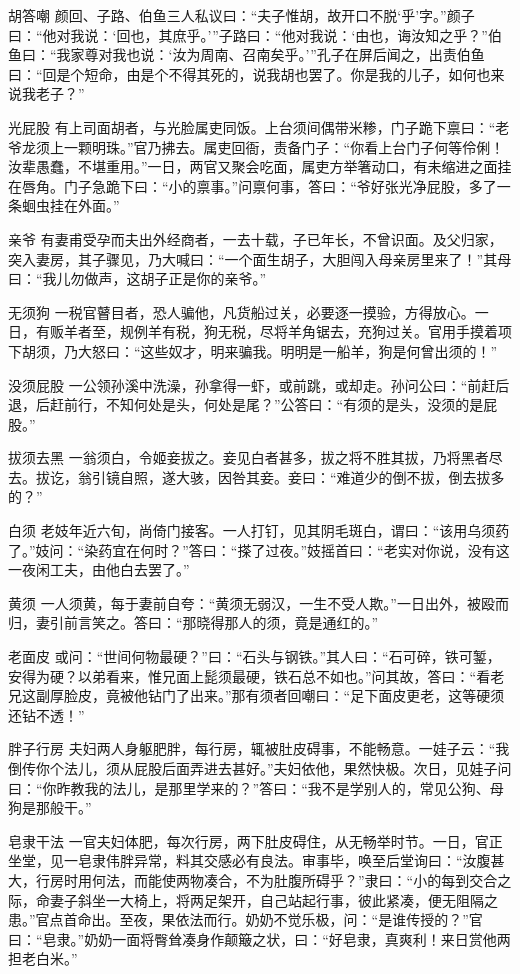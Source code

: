 \documentclass[12pt,UTF8]{ctexbook}
\begin{document}
胡答嘲
颜回、子路、伯鱼三人私议曰：“夫子惟胡，故开口不脱‘乎’字。”颜子曰：“他对我说：‘回也，其庶乎。’”子路曰：“他对我说：‘由也，诲汝知之乎？”伯鱼曰：“我家尊对我也说：‘汝为周南、召南矣乎。’”孔子在屏后闻之，出责伯鱼曰：“回是个短命，由是个不得其死的，说我胡也罢了。你是我的儿子，如何也来说我老子？”

光屁股
有上司面胡者，与光脸属吏同饭。上台须间偶带米糁，门子跪下禀曰：“老爷龙须上一颗明珠。”官乃拂去。属吏回衙，责备门子：“你看上台门子何等伶俐！汝辈愚蠢，不堪重用。”一日，两官又聚会吃面，属吏方举箸动口，有未缩进之面挂在唇角。门子急跪下曰：“小的禀事。”问禀何事，答曰：“爷好张光净屁股，多了一条蛔虫挂在外面。”

亲爷
有妻甫受孕而夫出外经商者，一去十载，子已年长，不曾识面。及父归家，突入妻房，其子骤见，乃大喊曰：“一个面生胡子，大胆闯入母亲房里来了！”其母曰：“我儿勿做声，这胡子正是你的亲爷。”

无须狗
一税官瞽目者，恐人骗他，凡货船过关，必要逐一摸验，方得放心。一日，有贩羊者至，规例羊有税，狗无税，尽将羊角锯去，充狗过关。官用手摸着项下胡须，乃大怒曰：“这些奴才，明来骗我。明明是一船羊，狗是何曾出须的！”

没须屁股
一公领孙溪中洗澡，孙拿得一虾，或前跳，或却走。孙问公曰：“前赶后退，后赶前行，不知何处是头，何处是尾？”公答曰：“有须的是头，没须的是屁股。”

拔须去黑
一翁须白，令姬妾拔之。妾见白者甚多，拔之将不胜其拔，乃将黑者尽去。拔讫，翁引镜自照，遂大骇，因咎其妾。妾曰：“难道少的倒不拔，倒去拔多的？”

白须
老妓年近六旬，尚倚门接客。一人打钉，见其阴毛斑白，谓曰：“该用乌须药了。”妓问：“染药宜在何时？”答曰：“搽了过夜。”妓摇首曰：“老实对你说，没有这一夜闲工夫，由他白去罢了。”

黄须
一人须黄，每于妻前自夸：“黄须无弱汉，一生不受人欺。”一日出外，被殴而归，妻引前言笑之。答曰：“那晓得那人的须，竟是通红的。”

老面皮
或问：“世间何物最硬？”曰：“石头与钢铁。”其人曰：“石可碎，铁可錾，安得为硬？以弟看来，惟兄面上髭须最硬，铁石总不如也。”问其故，答曰：“看老兄这副厚脸皮，竟被他钻门了出来。”那有须者回嘲曰：“足下面皮更老，这等硬须还钻不透！”

胖子行房
夫妇两人身躯肥胖，每行房，辄被肚皮碍事，不能畅意。一娃子云：“我倒传你个法儿，须从屁股后面弄进去甚好。”夫妇依他，果然快极。次日，见娃子问曰：“你昨教我的法儿，是那里学来的？”答曰：“我不是学别人的，常见公狗、母狗是那般干。”

皂隶干法
一官夫妇体肥，每次行房，两下肚皮碍住，从无畅举时节。一日，官正坐堂，见一皂隶伟胖异常，料其交感必有良法。审事毕，唤至后堂询曰：“汝腹甚大，行房时用何法，而能使两物凑合，不为肚腹所碍乎？”隶曰：“小的每到交合之际，命妻子斜坐一大椅上，将两足架开，自己站起行事，彼此紧凑，便无阻隔之患。”官点首命出。至夜，果依法而行。奶奶不觉乐极，问：“是谁传授的？”官曰：“皂隶。”奶奶一面将臀耸凑身作颠簸之状，曰：“好皂隶，真爽利！来日赏他两担老白米。”
\end{document}
